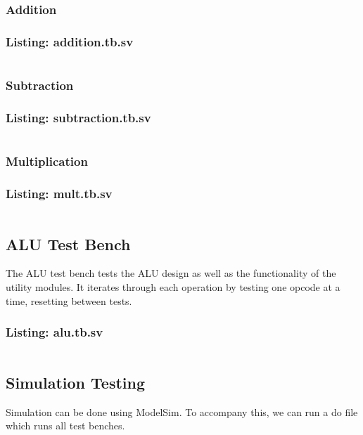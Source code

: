 \documentclass[12pt,letterpaper]{article}
\begin{document}
\subsubsection{Addition}
\subsubsection*{Listing: addition.tb.sv}
\inputminted[bgcolor = bggray, linenos, fontsize = \footnotesize, breaklines]{sv}{"../ALU_SystemVerilog/functions/testbenches/addition.tb.sv"}


\subsubsection{Subtraction}
\subsubsection*{Listing: subtraction.tb.sv}
\inputminted[bgcolor = bggray, linenos, fontsize = \footnotesize, breaklines]{sv}{"../ALU_SystemVerilog/functions/testbenches/subtraction.tb.sv"}

\subsubsection{Multiplication}
\subsubsection*{Listing: mult.tb.sv}
\inputminted[bgcolor = bggray, linenos, fontsize = \footnotesize, breaklines]{sv}{"../ALU_SystemVerilog/functions/testbenches/mult.tb.sv"}


\subsection{ALU Test Bench}
The ALU test bench tests the ALU design as well as the functionality of the utility modules. It iterates through each operation by testing one opcode
at a time, resetting between tests.
\subsubsection*{Listing: alu.tb.sv}
\inputminted[bgcolor = bggray, linenos, fontsize = \footnotesize, breaklines]{sv}{"../ALU_SystemVerilog/alu.tb.sv"}

\subsection{Simulation Testing}
Simulation can be done using ModelSim. To accompany this, we can run a do file which runs all test benches.
\end{document}
